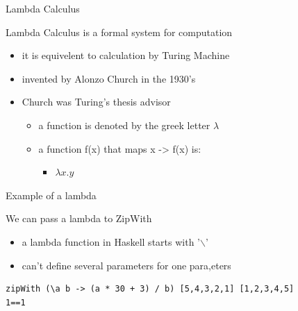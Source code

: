 \documentclass[presetation]{beamer}
\begin{document}
\begin{frame}[label={sec:org8503b8e}]{Lambda Calculus}
\begin{block}{Lambda Calculus is a formal system for computation}
\begin{itemize}
\item it is equivelent to calculation by Turing Machine
\item invented by Alonzo Church in the 1930's
\item Church was Turing's thesis advisor
\begin{itemize}
\item a function is denoted by the greek letter \(\lambda\)
\item a function f(x) that maps x -> f(x) is:
\begin{itemize}
\item \(\lambda x.y\)
\end{itemize}
\end{itemize}
\end{itemize}
\end{block}
\end{frame}
\begin{frame}[fragile,label={sec:org5b38b67}]{Example of a lambda}
 \begin{block}{We can pass a lambda to ZipWith}
\begin{itemize}
\item a lambda function in Haskell starts with '$\backslash$'
\item can't define several parameters for one para,eters
\end{itemize}
\begin{verbatim}
zipWith (\a b -> (a * 30 + 3) / b) [5,4,3,2,1] [1,2,3,4,5]
1==1
\end{verbatim}
\end{block}
\end{frame}
\end{document}
